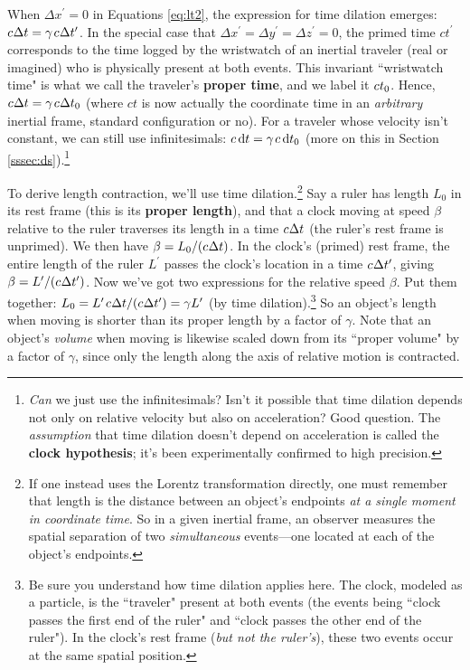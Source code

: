 \documentclass[12pt]{article}
\newcommand{\dd}[1]{\mathrm{d}#1}
\begin{document}
When $\Delta x^{\prime} = 0$ in Equations \ref{eq:lt2}, the expression for time dilation emerges: $c \mkern.5mu \Delta t = \gamma \mkern2mu c \mkern.5mu \Delta t^{\prime}$. In the special case that $\Delta x^{\prime} = \Delta y^{\prime} = \Delta z^{\prime} = 0$, the primed time $ct^{\prime}$ corresponds to the time logged by the wristwatch of an inertial traveler (real or imagined) who is physically present at both events. This invariant ``wristwatch time" is what we call the traveler's \textbf{proper time}, and we label it $c \mkern.5mu t_0$. Hence, $c \mkern.5mu \Delta t = \gamma \mkern2mu c \mkern.5mu \Delta t_0$ (where $ct$ is now actually the coordinate time in an \emph{arbitrary} inertial frame, standard configuration or no). For a traveler whose velocity isn't constant, we can still use infinitesimals: $c \, \dd t = \gamma \mkern2mu c \, \dd t_0$ (more on this in Section \ref{sssec:ds}).\footnote{\label{fn:ch}\emph{Can} we just use the infinitesimals? Isn't it possible that time dilation depends not only on relative velocity but also on acceleration? Good question. The \emph{assumption} that time dilation doesn't depend on acceleration is called the \textbf{clock hypothesis}; it's been experimentally confirmed to high precision.}

To derive length contraction, we'll use time dilation.\footnote{If one instead uses the Lorentz transformation directly, one must remember that length is the distance between an object's endpoints \emph{at a single moment in coordinate time}. So in a given inertial frame, an observer measures the spatial separation of two \emph{simultaneous} events---one located at each of the object's endpoints.} Say a ruler has length $L_0$ in its rest frame (this is its \textbf{proper length}), and that a clock moving at speed $\beta$ relative to the ruler traverses its length in a time $c \mkern.5mu \Delta t$ (the ruler's rest frame is unprimed). We then have $\beta = L_0 / (c \mkern.5mu \Delta t)$. In the clock's (primed) rest frame, the entire length of the ruler $L^\prime$ passes the clock's location in a time $c \mkern.5mu \Delta t^\prime$, giving $\beta = L^\prime / (c \mkern.5mu \Delta t^\prime)$. Now we've got two expressions for the relative speed $\beta$. Put them together: $L_0 = L^\prime \mkern2mu c \mkern.5mu \Delta t / (c \mkern.5mu \Delta t^\prime) = \gamma L^\prime$ (by time dilation).\footnote{Be sure you understand how time dilation applies here. The clock, modeled as a particle, is the ``traveler" present at both events (the events being ``clock passes the first end of the ruler" and ``clock passes the other end of the ruler"). In the clock's rest frame (\emph{but not the ruler's}), these two events occur at the same spatial position.} So an object's length when moving is shorter than its proper length by a factor of $\gamma$. Note that an object's \emph{volume} when moving is likewise scaled down from its ``proper volume" by a factor of $\gamma$, since only the length along the axis of relative motion is contracted.
\end{document}
